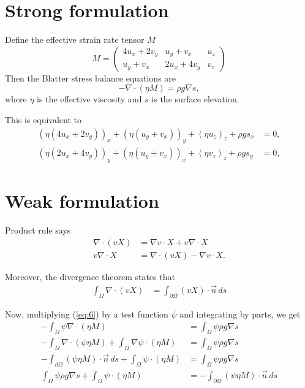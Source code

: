 \documentclass{article}
\begin{document}
\section{Strong formulation}
\label{sec:strong-formulation}
Define the effective strain rate tensor $M$
\begin{equation}
  \label{eq:5}
  M = \left(
  \begin{array}{ccc}
  4 u_x + 2 v_y & u_y + v_x & u_z\\
  u_y + v_x & 2 u_x + 4 v_y & v_z
  \end{array}
\right)
\end{equation}
Then the Blatter stress balance equations are
\begin{equation}
  \label{eq:6}
  - \nabla\cdot(\eta M) = \rho g \nabla s,
\end{equation}
where $\eta$ is the effective viscosity and $s$ is the surface elevation.

This is equivalent to
\begin{equation}
  \label{eq:7}
  \begin{aligned}
    \left(\eta (4 u_x + 2 v_y)\right)_x + \left(\eta (u_y + v_x)\right)_y + \left(\eta u_z\right)_z + \rho g s_x &= 0,\\
    \left(\eta (2 u_x + 4 v_y)\right)_y + \left(\eta (u_y + v_x)\right)_x + \left(\eta v_z\right)_z + \rho g s_y &= 0,
  \end{aligned}
\end{equation}
\section{Weak formulation}
\label{sec:weak-formulation}

Product rule says
\begin{align*}
  \nabla \cdot (v X) &= \nabla v \cdot X + v \nabla \cdot X\\
  v\nabla \cdot X &= \nabla\cdot(v X) - \nabla v \cdot X.
\end{align*}

Moreover, the divergence theorem states that
\begin{align*}
  \int_\Omega \nabla\cdot (v X) &= \int_{\partial \Omega} (v X)\cdot \vec n\, ds
\end{align*}

Now, multiplying (\ref{eq:6}) by a test function $\psi$ and integrating by parts, we get
\newcommand{\rhs}{\int_\Omega \psi \rho g \nabla s}
\begin{align}
  -\int_\Omega \psi \nabla\cdot(\eta M) &= \rhs\\
  -\int_\Omega \nabla\cdot (\psi \eta M) + \int_\Omega \nabla \psi \cdot (\eta M) &= \rhs\\
  -\int_{\partial \Omega} (\psi \eta M)\cdot \vec n\, ds + \int_\Omega \psi\cdot (\eta M) &= \rhs\\
  \rhs + \int_\Omega \psi\cdot (\eta M) &= - \int_{\partial \Omega} (\psi \eta M)\cdot \vec n\, ds
\end{align}
\end{document}
